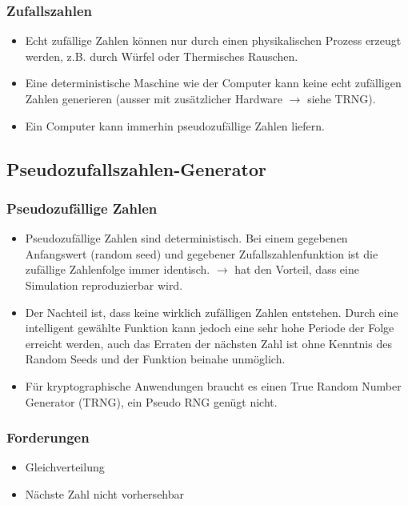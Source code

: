 \subsubsection{Zufallszahlen}
\begin{itemize}
	\item Echt zufällige Zahlen können nur durch einen physikalischen Prozess erzeugt werden, z.B. durch Würfel oder Thermisches Rauschen.
	\item Eine deterministische Maschine wie der Computer kann keine echt zufälligen Zahlen generieren (ausser mit zusätzlicher Hardware $\rightarrow$ siehe TRNG).
	\item Ein Computer kann immerhin pseudozufällige Zahlen liefern.
\end{itemize}

\subsection{Pseudozufallszahlen-Generator}
\subsubsection{Pseudozufällige Zahlen}
\begin{itemize}
	\item Pseudozufällige Zahlen sind deterministisch. Bei einem gegebenen Anfangswert (random seed) und gegebener Zufallszahlenfunktion ist die zufällige Zahlenfolge immer identisch. $\rightarrow$ hat den Vorteil, dass eine Simulation reproduzierbar wird.
	\item Der Nachteil ist, dass keine wirklich zufälligen Zahlen entstehen. Durch eine intelligent gewählte Funktion kann jedoch eine sehr hohe Periode der Folge erreicht werden, auch das Erraten der nächsten Zahl ist ohne Kenntnis des Random Seeds und der Funktion beinahe unmöglich.
	\item Für kryptographische Anwendungen braucht es einen True Random Number Generator (TRNG), ein Pseudo RNG genügt nicht.
\end{itemize}

\subsubsection{Forderungen}
\begin{itemize}
	\item Gleichverteilung
	\item Nächste Zahl nicht vorhersehbar
\end{itemize}

